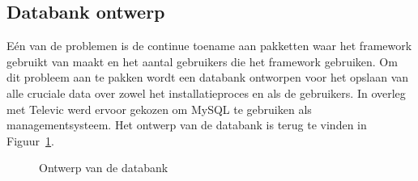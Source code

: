 \subsection{Databank ontwerp}\label{sec:databank}
Eén van de problemen is de continue toename aan pakketten waar het framework gebruikt van maakt en het aantal gebruikers die het framework gebruiken.
Om dit probleem aan te pakken wordt een databank ontworpen voor het opslaan van alle cruciale data over zowel het installatieproces en als de gebruikers.
In overleg met Televic werd ervoor gekozen om MySQL te gebruiken als managementsysteem.
Het ontwerp van de databank is terug te vinden in Figuur~\ref{fig:databank}.

\begin{figure}[!ht]
\centering
{}
\caption{Ontwerp van de databank}
\label{fig:databank}
\end{figure}

